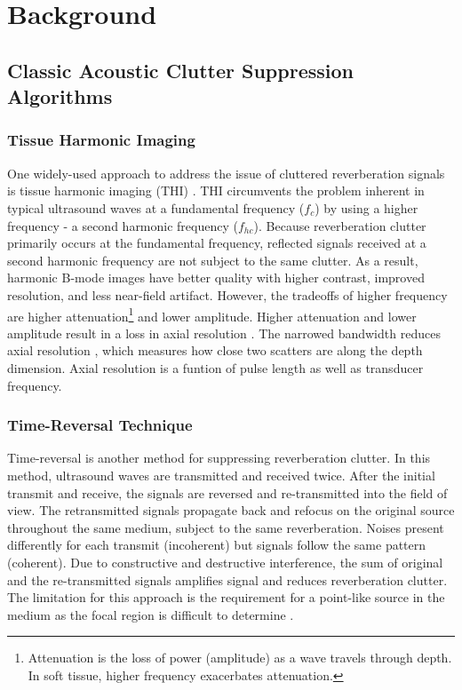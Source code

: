 \chapter{Background}


\section{Classic Acoustic Clutter Suppression Algorithms} %

\subsection{Tissue Harmonic Imaging}

One widely-used approach to address the issue of cluttered reverberation signals is tissue harmonic imaging (THI) \cite{christopher1997finite, ward1997nonlinear, averkiou1997nonlinear}. THI circumvents the problem inherent in typical ultrasound waves at a fundamental frequency ($f_{c}$) by using a higher frequency - a second harmonic frequency ($f_{hc}$). Because reverberation clutter primarily occurs at the fundamental frequency, reflected signals received at a second harmonic frequency are not subject to the same clutter. As a result, harmonic B-mode images have better quality with higher contrast, improved resolution, and less near-field artifact. However, the tradeoffs of higher frequency are higher attenuation\footnote{Attenuation is the loss of power (amplitude) as a wave travels through depth. In soft tissue, higher frequency exacerbates attenuation.} and lower amplitude. Higher attenuation and lower amplitude result in a loss in axial resolution \cite{muir1980prediction, starritt1986development, humphrey2000nonlinear, cobbold2006foundations, anvari2015primer}. The narrowed bandwidth reduces axial resolution \cite{whittingham1999tissue}, which measures how close two scatters are along the depth dimension. Axial resolution is a funtion of pulse length as well as transducer frequency.


\subsection{Time-Reversal Technique}
Time-reversal is another method for suppressing reverberation clutter. In this method, ultrasound waves are transmitted and received twice. After the initial transmit and receive, the signals are reversed and re-transmitted into the field of view. The retransmitted signals propagate back and refocus on the original source throughout the same medium, subject to the same reverberation. Noises present differently for each transmit (incoherent) but signals follow the same pattern (coherent). Due to constructive and destructive interference, the sum of original and the re-transmitted signals amplifies signal and reduces reverberation clutter. The limitation for this approach is the requirement for a point-like source in the medium as the focal region is difficult to determine \cite{dei_2019, fink1992time}.

